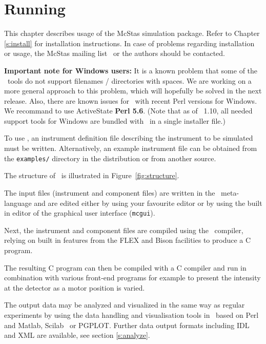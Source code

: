 
\chapter{Running \MCS}
\label{c:running}
This chapter describes usage of the McStas simulation package. Refer
to Chapter \ref{s:install} for installation instructions. In case of
problems regarding installation or usage, the McStas mailing
list~\cite{mcstas_webpage} or the authors should be contacted.

{\bf Important note for Windows users:} It is a known problem that some of
the \MCS\ tools do not support filenames / directories with spaces.
We are working on a more general approach to this problem, which will
hopefully be solved in the next release. Also, there are known issues
for \MCS\ with recent Perl versions for Windows. We recommand to use
ActiveState {\bf Perl 5.6}. (Note that as of \MCS\ 1.10, all needed
support tools for Windows are bundled with \MCS\ in a single installer file.)

To use \MCS, an instrument
definition file describing the instrument to be simulated must be
written. Alternatively, an example instrument file can be obtained
from the \verb+examples/+ directory in the distribution or from
another source.

The structure of \MCS\ is illustrated in Figure~\ref{fig:structure}.

The input files (instrument and component files) are written in the \MCS\
meta-language and are edited either by using your favourite editor
or by using the built in editor of the graphical user interface
(\texttt{mcgui}).

Next, the instrument and component files are compiled using the \MCS\
compiler, relying on built in features from the FLEX and Bison facilities to produce a C program.

The resulting C program can then be
compiled with a C compiler and run in combination with various
front-end programs for example to present the intensity at the
detector as a motor position is varied.

The output data may be analyzed and visualized in the same way as
regular experiments by using the data handling and visualisation tools in \MCS\ based on
Perl and Matlab, Scilab~\cite{scilab_webpage} or PGPLOT. Further data
output formats including IDL and XML are available, see section \ref{s:analyze}.

